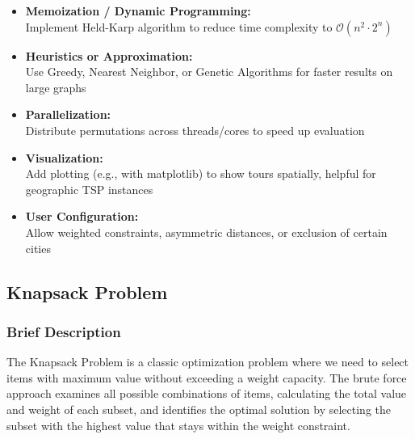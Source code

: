 \documentclass{article}
\begin{document}
\begin{itemize}
    \item \textbf{Memoization / Dynamic Programming:} \\
    Implement Held-Karp algorithm to reduce time complexity to \(\mathcal{O}(n^2 \cdot 2^n)\)

    \item \textbf{Heuristics or Approximation:} \\
    Use Greedy, Nearest Neighbor, or Genetic Algorithms for faster results on large graphs

    \item \textbf{Parallelization:} \\
    Distribute permutations across threads/cores to speed up evaluation

    \item \textbf{Visualization:} \\
    Add plotting (e.g., with matplotlib) to show tours spatially, helpful for geographic TSP instances

    \item \textbf{User Configuration:} \\
    Allow weighted constraints, asymmetric distances, or exclusion of certain cities
\end{itemize}

\subsection{Knapsack Problem}
\subsubsection*{Brief Description}
The Knapsack Problem is a classic optimization problem where we need to select items with maximum value without exceeding a weight capacity. The brute force approach examines all possible combinations of items, calculating the total value and weight of each subset, and identifies the optimal solution by selecting the subset with the highest value that stays within the weight constraint.
\end{document}
